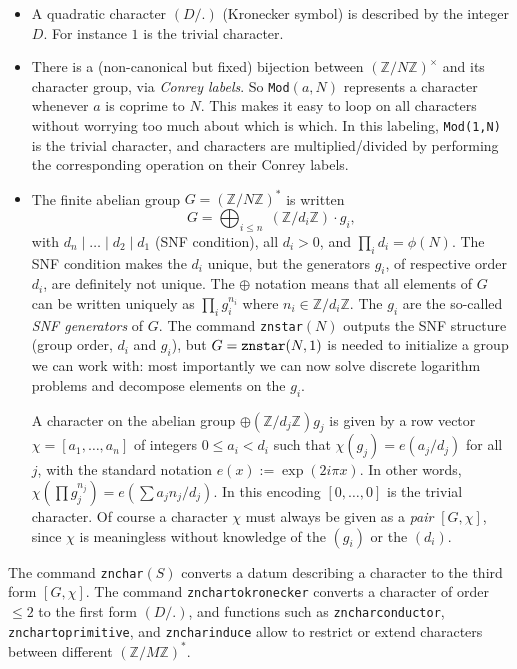 \documentclass[11pt]{article}
\newcommand{\Z}{{\mathbb Z}}
\def\kbd#1{{\tt #1}}
\begin{document}
\begin{itemize}

\item A quadratic character $(D/.)$ (Kronecker symbol) is described by
the integer $D$. For instance $1$ is the trivial character.

\item There is a (non-canonical but fixed) bijection between $(\Z/N\Z)^\times$
and its character group, via \emph{Conrey labels}. So \kbd{Mod}$(a,N)$
represents a character whenever $a$ is coprime to $N$. This makes it easy
to loop on all characters without worrying too much about which is which.
In this labeling, \kbd{Mod(1,N)} is the trivial character, and characters
are multiplied/divided by performing the corresponding operation on their
Conrey labels.

\item The finite abelian group $G = (\Z/N\Z)^*$ is written
$$G = \bigoplus_{i\leq n}\; (\Z/d_i\Z) \cdot g_i,$$
with $d_n \mid \dots \mid d_2 \mid d_1$ (SNF condition), all $d_i > 0$, and
$\prod_i d_i = \phi(N)$. The SNF condition makes the $d_i$ unique, but the
generators $g_i$, of respective order $d_i$, are definitely not unique. The
$\oplus$ notation means that all elements of $G$ can be written uniquely as
$\prod_i g_i^{n_i}$ where $n_i \in \Z/d_i\Z$. The $g_i$ are the so-called
\emph{SNF generators} of $G$. The command \kbd{znstar}$(N)$ outputs the SNF
structure (group order, $d_i$ and  $g_i$), but $G = \kbd{znstar}(N, 1)$ is
needed to initialize a group we can work with: most importantly we can now
solve discrete logarithm problems and decompose elements on the $g_i$.

A character on the abelian group $\oplus (\Z/d_j\Z) g_j$ is given by a row
vector $\chi = [a_1,\ldots,a_n]$ of integers $0\leq a_i  < d_i$ such that
$\chi(g_j) = e(a_j / d_j)$ for all $j$, with the standard notation $e(x) :=
\exp(2i\pi x)$. In other words, $\chi(\prod g_j^{n_j}) = e(\sum a_j n_j /
d_j)$. In this encoding $[0,\dots,0]$ is the trivial character. Of course
a character $\chi$ must always be given as a \emph{pair} $[G,\chi]$,
since $\chi$ is meaningless without knowledge of the $(g_i)$ or the $(d_i)$.
\end{itemize}

The command \kbd{znchar}$(S)$ converts a datum describing a character to the
third form $[G,\chi]$. The command \kbd{znchartokronecker} converts a
character of order $\leq 2$ to the first form $(D/.)$, and functions such
as \kbd{zncharconductor}, \kbd{znchartoprimitive}, and \kbd{zncharinduce}
allow to restrict or extend characters between different $(\Z/M\Z)^*$.
\end{document}
